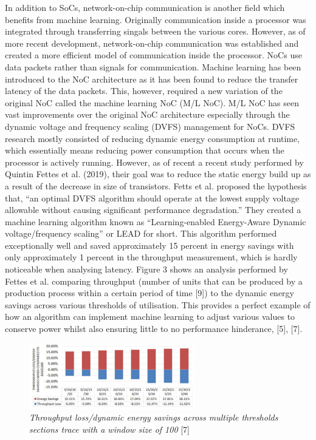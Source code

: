 \documentclass[conference]{IEEEtran}
\begin{document}
In addition to SoCs, network-on-chip communication is another field which benefits from machine learning. Originally communication inside a processor was integrated through transferring singals between 
the various cores. However, as of more recent development, network-on-chip communication was established and created a more efficient model of communication inside the processor. NoCs use 
data packets rather than signals for communication. Machine learning has been introduced to the NoC architecture as it has been found to reduce the transfer latency of the data packets. 
This, however, required a new variation of the original NoC called the machine learning NoC (M/L NoC). M/L NoC has seen vast improvements over the original NoC architecture especially through the dynamic 
voltage and frequency scaling (DVFS) management for NoCs. DVFS research mostly consisted of reducing dynamic energy consumption at runtime, which essentially means reducing power consumption that occurs 
when the processor is actively running. However, as of recent a recent study performed by Quintin Fettes et al. (2019), their goal was to reduce the static energy build up as a result of the decrease in 
size of transistors. Fetts et al. proposed the hypothesis that, ``an optimal DVFS algorithm should operate at the lowest supply voltage allowable without causing significant performance degradation.''
They created a machine learning algorithm known as ``Learning-enabled Energy-Aware Dynamic voltage/frequency scaling'' or LEAD for short. This algorithm performed exceptionally well and saved approximately 
15 percent in energy savings with only approximately 1 percent in the throughput measurement, which is hardly noticeable when analysing latency. Figure 3 shows an analysis performed by Fettes et al. comparing 
throughput (number of units that can be produced by a production process within a certain period of time [9]) to the dynamic energy savings across various thresholds of utilisation. This provides a perfect example 
of how an algorithm can implement machine learning to adjust various values to conserve power whilst also ensuring little to no performance hinderance, [5], [7].
\begin{figure}
    \centering
    \includegraphics[width=7.2cm]{imgs/dvfs-LEAD-savings.png}
    \caption{\textit{Throughput loss/dynamic energy savings across multiple thresholds sections trace with a window size of 100} [7]}
\end{figure}
\end{document}
